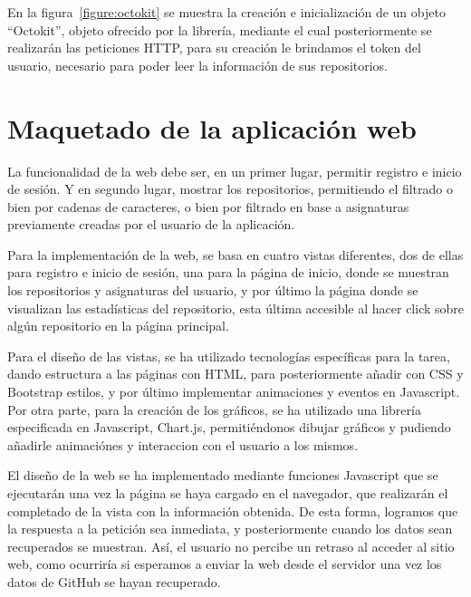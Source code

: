 En la figura~\ref{figure:octokit} se muestra la creación e inicialización
de un objeto “Octokit”, objeto ofrecido por la librería, mediante el cual
posteriormente se realizarán las peticiones HTTP, para su creación le
brindamos el token del usuario, necesario para poder leer la información de
sus repositorios.


\section{Maquetado de la aplicación web}

La funcionalidad de la web debe ser, en un primer lugar, permitir registro
e inicio de sesión. Y en segundo lugar, mostrar los repositorios,
permitiendo el filtrado o bien por cadenas de caracteres, o bien por
filtrado en base a asignaturas previamente creadas por el usuario de la
aplicación.

Para la implementación de la web, se basa en cuatro vistas diferentes, dos
de ellas para registro e inicio de sesión, una para la página de inicio,
donde se muestran los repositorios y asignaturas del usuario, y por último
la página donde se visualizan las estadísticas del repositorio, esta última
accesible al hacer click sobre algún repositorio en la página principal.

Para el diseño de las vistas, se ha utilizado tecnologías específicas para
la tarea, dando estructura a las páginas con HTML, para posteriormente
añadir con CSS\cite{GradienteCSS} y Bootstrap\cite{Bootstrap} estilos, y
por último implementar animaciones y eventos en Javascript. Por otra parte,
para la creación de los gráficos, se ha utilizado una librería especificada
en Javascript, Chart.js\cite{ChartJS,ChartJSIntro}, permitiéndonos dibujar
gráficos y pudiendo añadirle animaciónes y interaccion con el usuario a los
mismos.


El diseño de la web se ha implementado mediante funciones Javascript que se
ejecutarán una vez la página se haya cargado en el navegador, que
realizarán el completado de la vista con la información obtenida. De esta
forma, logramos que la respuesta a la petición sea inmediata, y
posteriormente cuando los datos sean recuperados se muestran. Así, el
usuario no percibe un retraso al acceder al sitio web, como ocurriría si
esperamos a enviar la web desde el servidor una vez los datos de GitHub se
hayan recuperado.

